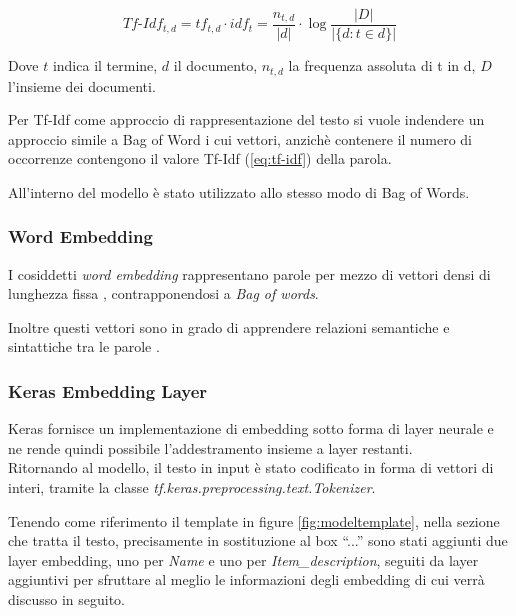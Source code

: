 \begin{equation}
	\label{eq:tf-idf}
	Tf\mbox{-}Idf_{t,d}
	=
	tf_{t,d} \cdot idf_t
	=
	\frac{n_{t,d}}{|d|} \cdot \log \frac{|D|}{|\{d: t \in d\}|}
\end{equation}

Dove $t$ indica il termine, $d$ il documento, $n_{t,d}$ la frequenza assoluta di
t in d, $D$ l'insieme dei documenti.

Per Tf-Idf come approccio di rappresentazione del testo si vuole indendere un
approccio simile a Bag of Word i cui vettori, anzichè contenere il
numero di occorrenze contengono il valore Tf-Idf (\ref{eq:tf-idf}) della parola.

All'interno del modello è stato utilizzato allo stesso modo di Bag
of Words.

\subsubsection{Word Embedding}

I cosiddetti \textit{word embedding} rappresentano parole per mezzo di vettori
densi di lunghezza fissa \cite{almeida2019word}, contrapponendosi a  \textit{Bag
	of words}.

Inoltre questi vettori sono in grado di apprendere relazioni semantiche e
sintattiche tra le parole \cite{mikolov2013efficient}.

\subsubsection{Keras Embedding Layer}

Keras fornisce un implementazione di embedding sotto forma di layer neurale e
ne rende quindi possibile l'addestramento insieme a layer restanti.
\\
Ritornando al modello, il testo in input è stato codificato in forma di
vettori di interi, tramite la classe \textit{tf.keras.preprocessing.\-text.Tokenizer}.

Tenendo come riferimento il template in figure
\ref{fig:modeltemplate}, nella sezione che tratta il testo, precisamente in
sostituzione al box ``...'' sono stati aggiunti due layer embedding, uno per
\textit{Name} e uno per \textit{Item\_description}, seguiti da layer aggiuntivi
per sfruttare al meglio le informazioni degli embedding di cui verrà discusso in
seguito.

